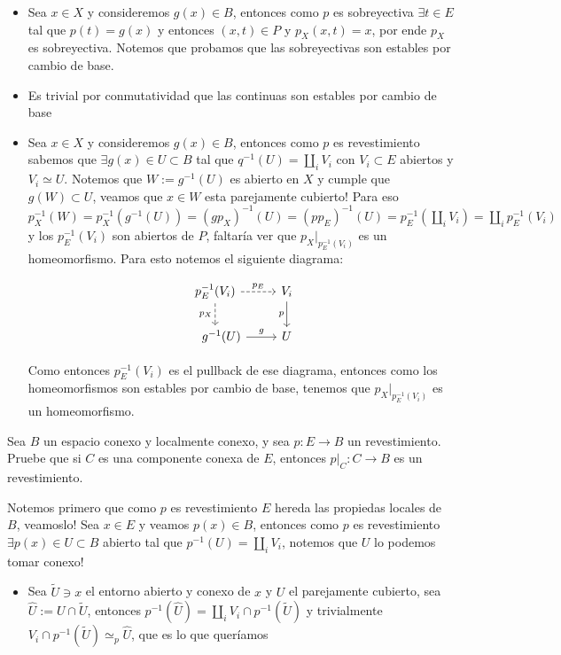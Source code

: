 \documentclass[11pt]{article}
\newenvironment{proof}[1][Demostraci\'on]{\begin{trivlist}
\item[\hskip \labelsep {\bfseries #1}]}{\end{trivlist}}
\newcommand{\qed}{\nobreak \ifvmode \relax \else
      \ifdim\lastskip<1.5em \hskip-\lastskip
      \hskip1.5em plus0em minus0.5em \fi \nobreak
      \vrule height0.75em width0.5em depth0.25em\fi}
\begin{document}
\begin{enumerate}
\begin{proof}
\begin{itemize}
\item Sea $x \in X$ y consideremos $g(x) \in B$, entonces como $p$ es sobreyectiva $\exists t \in E$ tal que $p(t)=g(x)$ y entonces $(x,t) \in P$ y $p_X(x,t)=x$, por ende $p_X$ es sobreyectiva. Notemos que probamos que las sobreyectivas son estables por cambio de base.

\item Es trivial por conmutatividad que las continuas son estables por cambio de base

\item Sea $x \in X$ y consideremos $g(x) \in B$, entonces como $p$ es revestimiento sabemos que $\exists g(x) \in U \subset B$ tal que $q^{-1}(U)= \coprod_{i}{V_i}$ con $V_i \subset E$ abiertos y $V_i \simeq U$. Notemos que $W:=g^{-1}(U)$ es abierto en $X$ y cumple que $g(W) \subset U$, veamos que $x \in W$ esta parejamente cubierto! Para eso $p_X^{-1}(W) = p_X^{-1}(g^{-1}(U)) = (gp_X)^{-1}(U) = (pp_E)^{-1}(U) = p_E^{-1}(\coprod_{i}{V_i}) = \coprod_{i}{p_E^{-1}(V_i)}$ y los $p_E^{-1}(V_i)$ son abiertos de $P$, faltar\'ia ver que $p_X|_{p_E^{-1}(V_i)}$ es un homeomorfismo. Para esto notemos el siguiente diagrama:


\[
\begin{tikzcd}
p_E^{-1}(V_i) \arrow[dashed]{r}{p_E} \arrow[swap,dashed]{d}{p_X} & V_i \arrow[swap]{d}{p} \\ \quad 
g^{-1}(U) \arrow{r}{g} & U
\end{tikzcd}
\]

Como entonces $p_E^{-1}(V_i)$ es el pullback de ese diagrama, entonces como los homeomorfismos son estables por cambio de base, tenemos que $p_X|_{p_E^{-1}(V_i)}$ es un homeomorfismo. \qed

\end{itemize}

\end{proof}

\item {Sea $B$ un espacio conexo y localmente conexo, y sea $p:E\to B$ un revestimiento. Pruebe que si $C$ es una componente conexa de $E$, entonces $p|_C:C\to B$ es un revestimiento.
}

\begin{proof}

Notemos primero que como $p$ es revestimiento $E$ hereda las propiedas locales de $B$, veamoslo! Sea $x \in E$ y veamos $p(x) \in B$, entonces como $p$ es revestimiento $\exists p(x) \in U \subset B$ abierto tal que $p^{-1}(U) = \coprod_{i}{V_i}$, notemos que $U$ lo podemos tomar conexo!
\begin{itemize}
\item Sea $\widetilde{U} \ni x$ el entorno abierto y conexo de $x$ y $U$ el parejamente cubierto, sea $\widehat{U}:=U \cap \widetilde{U}$, entonces $p^{-1}(\widehat{U}) = \coprod_{i}{V_i \cap p^{-1}(\widetilde{U})}$ y trivialmente $V_i \cap p^{-1}(\widetilde{U}) \simeq_p \widehat{U}$, que es lo que quer\'iamos
\end{itemize}


\end{proof}
\end{enumerate}
\end{document}
